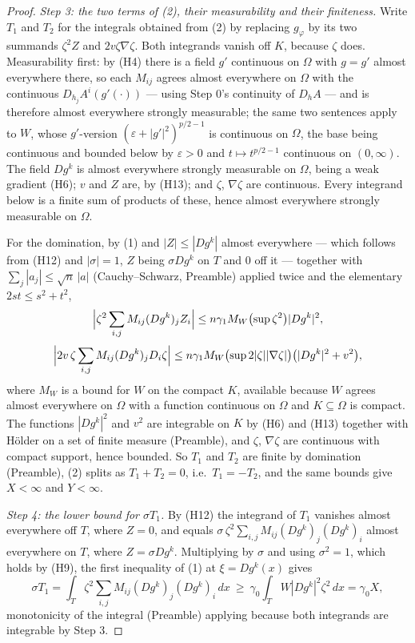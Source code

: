 \begin{proof}
\emph{Step 3: the two terms of (2), their measurability and their finiteness.}
Write $T_1$ and $T_2$ for the integrals obtained from (2) by replacing
$g_\varphi$ by its two summands $\zeta^2Z$ and $2v\zeta\nabla\zeta$.  Both
integrands vanish off $K$, because $\zeta$ does.  Measurability first: by (H4)
there is a field $g'$ continuous on $\Omega$ with $g=g'$ almost everywhere
there, so each $M_{ij}$ agrees almost everywhere on $\Omega$ with the
continuous $D_{h_j}A^i(g'(\cdot))$ --- using Step 0's continuity of $D_hA$ ---
and is therefore almost everywhere strongly measurable; the same two sentences
apply to $W$, whose $g'$-version $(\varepsilon+|g'|^2)^{p/2-1}$ is continuous on
$\Omega$, the base being continuous and bounded below by $\varepsilon>0$ and
$t\mapsto t^{p/2-1}$ continuous on $(0,\infty)$.  The field $Dg^k$ is almost
everywhere strongly measurable on $\Omega$, being a weak gradient (H6); $v$ and
$Z$ are, by (H13); and $\zeta$, $\nabla\zeta$ are continuous.  Every integrand
below is a finite sum of products of these, hence almost everywhere strongly
measurable on $\Omega$.

For the domination, by (1) and $|Z|\le|Dg^k|$ almost everywhere --- which
follows from (H12) and $|\sigma|=1$, $Z$ being $\sigma Dg^k$ on $T$ and $0$ off
it --- together with $\sum_j|a_j|\le\sqrt n\,|a|$ (Cauchy--Schwarz, Preamble)
applied twice and the elementary $2st\le s^2+t^2$,
\[
\Bigl|\zeta^2\sum_{i,j}M_{ij}(Dg^k)_j Z_i\Bigr|
\le n\gamma_1M_W\bigl(\sup\zeta^2\bigr)|Dg^k|^2 ,
\]
\[
\Bigl|2v\,\zeta\sum_{i,j}M_{ij}(Dg^k)_jD_i\zeta\Bigr|
\le n\gamma_1M_W\bigl(\sup2|\zeta||\nabla\zeta|\bigr)
\bigl(|Dg^k|^2+v^2\bigr) ,
\]
where $M_W$ is a bound for $W$ on the compact $K$, available because $W$ agrees
almost everywhere on $\Omega$ with a function continuous on $\Omega$ and
$K\subseteq\Omega$ is compact.  The functions $|Dg^k|^2$ and $v^2$ are
integrable on $K$ by (H6) and (H13) together with H\"older on a set of finite
measure (Preamble), and $\zeta$, $\nabla\zeta$ are continuous with compact
support, hence bounded.  So $T_1$ and $T_2$ are finite by domination
(Preamble), (2) splits as $T_1+T_2=0$, i.e.\ $T_1=-T_2$, and the same bounds
give $X<\infty$ and $Y<\infty$.

\emph{Step 4: the lower bound for $\sigma T_1$.}  By (H12) the integrand of
$T_1$ vanishes almost everywhere off $T$, where $Z=0$, and equals
$\sigma\,\zeta^2\sum_{i,j}M_{ij}(Dg^k)_j(Dg^k)_i$ almost everywhere on $T$,
where $Z=\sigma Dg^k$.  Multiplying by $\sigma$ and using $\sigma^2=1$, which
holds by (H9), the first inequality of (1) at $\xi=Dg^k(x)$ gives
\[
\sigma T_1
=\int_T\zeta^2\sum_{i,j}M_{ij}(Dg^k)_j(Dg^k)_i\,dx
\ \ge\ \gamma_0\int_TW|Dg^k|^2\zeta^2\,dx=\gamma_0X ,
\]
monotonicity of the integral (Preamble) applying because both integrands are
integrable by Step 3.


\end{proof}
